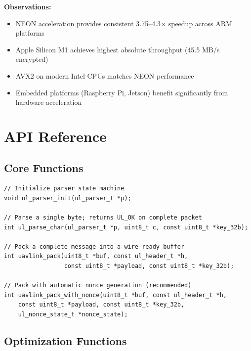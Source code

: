 \documentclass[11pt,a4paper]{article}
\begin{document}
\textbf{Observations:}
\begin{itemize}[noitemsep]
    \item NEON acceleration provides consistent 3.75--4.3$\times$ speedup across ARM platforms
    \item Apple Silicon M1 achieves highest absolute throughput (45.5 MB/s encrypted)
    \item AVX2 on modern Intel CPUs matches NEON performance
    \item Embedded platforms (Raspberry Pi, Jetson) benefit significantly from hardware acceleration
\end{itemize}

\newpage
\section{API Reference}

\subsection{Core Functions}

\begin{lstlisting}
// Initialize parser state machine
void ul_parser_init(ul_parser_t *p);

// Parse a single byte; returns UL_OK on complete packet
int ul_parse_char(ul_parser_t *p, uint8_t c, const uint8_t *key_32b);

// Pack a complete message into a wire-ready buffer
int uavlink_pack(uint8_t *buf, const ul_header_t *h,
                 const uint8_t *payload, const uint8_t *key_32b);

// Pack with automatic nonce generation (recommended)
int uavlink_pack_with_nonce(uint8_t *buf, const ul_header_t *h,
    const uint8_t *payload, const uint8_t *key_32b,
    ul_nonce_state_t *nonce_state);
\end{lstlisting}

\subsection{Optimization Functions}
\end{document}
